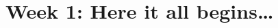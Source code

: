 \documentclass[11pt,a4paper]{book}
\begin{document}


\chapter{Week 1: Here it all begins\ldots}






%
\end{document}
